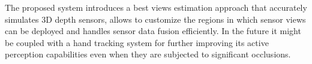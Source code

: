 The proposed system introduces a best views estimation approach that accurately simulates 3D depth sensors, allows to customize the regions in which sensor views can be deployed and handles sensor data fusion efficiently. In the future it might be coupled with a hand tracking system \cite{Hamer2009,Kyriazis2013,Sridhar2016} for further improving its active perception capabilities even when they are subjected to significant occlusions.
